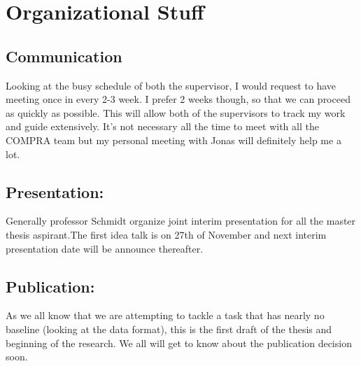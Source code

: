 \documentclass[a4paper,12pt]{article}
\begin{document}
\section{Organizational Stuff}

\subsection{Communication}
Looking at the busy schedule of both the supervisor, I would request to have meeting once in every 2-3 week. I prefer 2 weeks though, so that we can proceed as quickly as possible. This will allow both of the supervisors to track my work and guide extensively. It's not necessary all the time to meet with all the COMPRA team but my personal meeting with Jonas will definitely help me a lot.
\bigskip

\subsection{Presentation:}
Generally professor Schmidt organize joint interim presentation for all the master thesis aspirant.The first idea talk is on 27th of November and next interim presentation date will be announce thereafter.
\bigskip

\subsection{Publication:} 
As we all know that we are attempting to tackle a task that has nearly no baseline (looking at the data format), this is the first draft of the thesis and beginning of the research. We all will get to know about the publication decision soon. 




\end{document}
